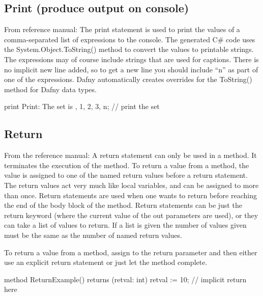 \documentclass[letterpaper,10pt,english]{sphinxmanual}
\begin{document}
\subsection{Print (produce output on console)}
\label{\detokenize{06-dafny-language:print-produce-output-on-console}}
From reference manual: The print statement is used to print the values
of a comma-separated list of expressions to the console.  The
generated C\# code uses the System.Object.ToString() method to convert
the values to printable strings. The expressions may of course include
strings that are used for captions. There is no implicit new line
added, so to get a new line you should include “n” as part of one of
the expressions. Dafny automatically creates overrides for the
ToString() method for Dafny data types.

\begin{sphinxVerbatim}[commandchars=\\\{\}]
print \PYGZdq{}Print: The set is \PYGZdq{}, \PYGZob{} 1, 2, 3\PYGZcb{}, \PYGZdq{}\PYGZbs{}n\PYGZdq{}; // print the set
\end{sphinxVerbatim}


\subsection{Return}
\label{\detokenize{06-dafny-language:return}}
From the reference manual: A return statement can only be used in a
method. It terminates the execution of the method. To return a value
from a method, the value is assigned to one of the named return values
before a return statement. The return values act very much like local
variables, and can be assigned to more than once. Return statements
are used when one wants to return before reaching the end of the body
block of the method.  Return statements can be just the return keyword
(where the current value of the out parameters are used), or they can
take a list of values to return. If a list is given the number of
values given must be the same as the number of named return values.

To return a value from a method, assign to the return parameter
and then either use an explicit return statement or just let the
method complete.

\begin{sphinxVerbatim}[commandchars=\\\{\}]
method ReturnExample() returns (retval: int)
\PYGZob{}
    retval := 10;
    // implicit return here
\PYGZcb{}
\end{sphinxVerbatim}
\end{document}
